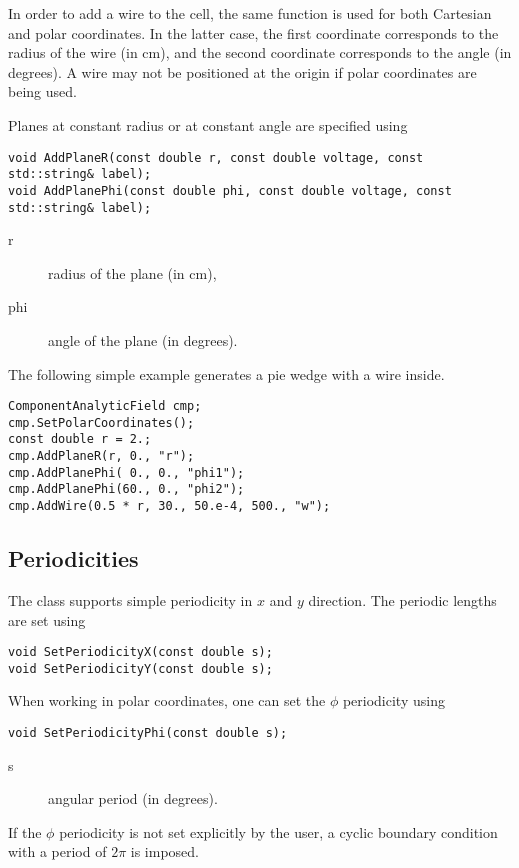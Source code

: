 In order to add a wire 
to the cell, the same function is used 
for both Cartesian and polar coordinates. In the latter case, the 
first coordinate corresponds to the radius of the wire (in cm), 
and the second coordinate corresponds to the angle (in degrees). 
A wire may not be positioned at the origin if polar coordinates are being used.

Planes at constant radius or at constant angle are specified using
\begin{lstlisting}
void AddPlaneR(const double r, const double voltage, const std::string& label);
void AddPlanePhi(const double phi, const double voltage, const std::string& label);
\end{lstlisting}
\begin{description}
  \item[r] radius of the plane (in cm),
  \item[phi] angle of the plane (in degrees).
\end{description}

The following simple example generates a pie wedge with a wire inside.
\begin{lstlisting}
ComponentAnalyticField cmp;
cmp.SetPolarCoordinates();
const double r = 2.;
cmp.AddPlaneR(r, 0., "r");
cmp.AddPlanePhi( 0., 0., "phi1");
cmp.AddPlanePhi(60., 0., "phi2");
cmp.AddWire(0.5 * r, 30., 50.e-4, 500., "w");
\end{lstlisting}

\subsection{Periodicities}
The class supports simple periodicity in \(x\) and \(y\) direction.
The periodic lengths are set using
\begin{lstlisting}
void SetPeriodicityX(const double s);
void SetPeriodicityY(const double s);
\end{lstlisting}

When working in polar coordinates, one can set the $\phi$ periodicity 
using
\begin{lstlisting}
void SetPeriodicityPhi(const double s);
\end{lstlisting} 
\begin{description}
  \item[s] angular period (in degrees).
\end{description}
If the $\phi$ periodicity is not set explicitly by the user, 
a cyclic boundary condition with a period of $2\pi$ is imposed.

